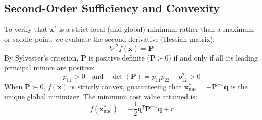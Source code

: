 \documentclass[11pt,a4paper]{article}
\begin{document}
\subsection{Second-Order Sufficiency and Convexity}
To verify that $\mathbf{x}^*$ is a strict local (and global) minimum rather than a maximum or saddle point, we evaluate the second derivative (Hessian matrix):
\begin{equation}
\nabla^2 f(\mathbf{x}) = \mathbf{P}
\end{equation}
By Sylvester's criterion, $\mathbf{P}$ is positive definite ($\mathbf{P} \succ 0$) if and only if all its leading principal minors are positive:
\begin{equation}
p_{11} > 0 \quad \text{and} \quad \det(\mathbf{P}) = p_{11} p_{22} - p_{12}^2 > 0
\end{equation}
When $\mathbf{P} \succ 0$, $f(\mathbf{x})$ is strictly convex, guaranteeing that $\mathbf{x}^*_{\mathrm{unc}} = -\mathbf{P}^{-1} \mathbf{q}$ is the unique global minimizer. The minimum cost value attained is:
\begin{equation}
f(\mathbf{x}^*_{\mathrm{unc}}) = -\frac{1}{2} \mathbf{q}^T \mathbf{P}^{-1} \mathbf{q} + r
\end{equation}
\end{document}
